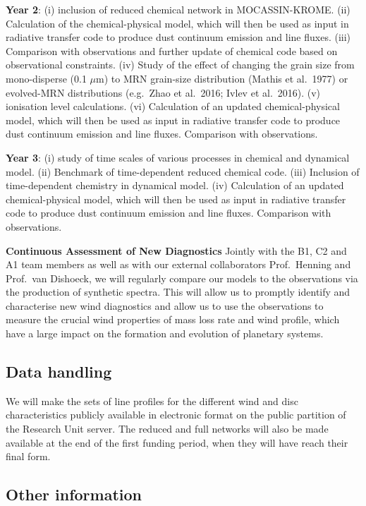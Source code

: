 \documentclass[10pt,fleqn,twoside]{article}
\begin{document}
{\Tcol\bf Year 2}: (i) inclusion of reduced chemical network in MOCASSIN-KROME. (ii) Calculation of the chemical-physical model, which will then be used as input in radiative transfer code to produce dust continuum emission and line fluxes. (iii) Comparison with observations and further update of chemical code based on observational constraints. (iv) Study of the effect of changing the grain size from mono-disperse (0.1 $\mu$m) to MRN grain-size distribution (Mathis et al.\ 1977) or evolved-MRN distributions (e.g.\ Zhao et al.\ 2016; Ivlev et al.\ 2016). (v) ionisation level calculations. (vi)  Calculation of an updated chemical-physical model, which will then be used as input in radiative transfer code to produce dust continuum emission and line fluxes. Comparison with observations.

{\Tcol\bf Year 3}: (i) study of time scales of various processes in chemical and dynamical model. (ii) Benchmark of time-dependent reduced chemical code. (iii) Inclusion of time-dependent chemistry in dynamical model. (iv)  Calculation of an updated chemical-physical model, which will then be used as input in radiative transfer code to produce dust continuum emission and line fluxes. Comparison with observations.

{\Tcol\bf Continuous Assessment of New Diagnostics} Jointly with the B1, C2 and A1 team members as well as with our external collaborators Prof.\ Henning and Prof.\ van Dishoeck, we will regularly compare our models to the observations via the production of synthetic spectra. This will allow us to promptly identify and characterise new wind diagnostics and allow us to use the observations to measure the crucial wind properties of mass loss rate and wind profile, which have a large impact on the formation and evolution of planetary systems. 

\subsection{Data handling}
We will make the sets of line profiles for the different wind and disc characteristics publicly available in electronic format on the public partition of the Research Unit server. The reduced and full networks will also be made available at the end of the first funding period, when they will have reach their final form. 

\subsection{Other information}
\end{document}
